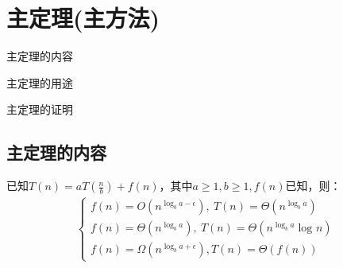 \chapter{主定理(主方法)}
\begin{introduction}
	\item 主定理的内容
	\item 主定理的用途
	\item 主定理的证明
\end{introduction}
\section{主定理的内容}
已知$T(n) = a T(\frac{n}{b}) + f(n)$，其中$a\geq 1, b\geq 1, f(n)$已知，则：
$$
\begin{array}{l}  
  \left\{\begin{matrix} 
  f(n) = O(n^{\log_{b}{a} - \epsilon} ),~T(n) = \Theta(n^{\log_{b}{a}} )  \\ 
  f(n) =  \Theta(n^{\log_{b}{a}} ),~T(n) = \Theta(n^{\log_{b}{a}}\log_{}{n} ) \\ 
  f(n) = \Omega (n^{\log_{b}{a} + \epsilon} ),T(n) = \Theta (f(n))
\end{matrix}\right.    
\end{array} 
$$
